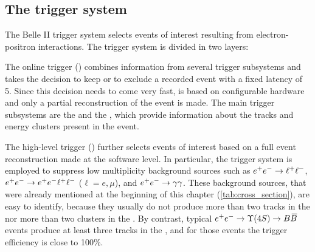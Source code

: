 \subsection{The trigger system} \label{sec:trigger}
The Belle II trigger system selects events of interest resulting from electron-positron interactions.
The trigger system is divided in two layers:
\bi
\item The online trigger (\LO) combines information from several trigger subsystems and takes the decision to keep or to exclude a recorded event with a fixed latency of 5\mus.
Since this decision needs to come very fast, \LO is based on configurable hardware and only a partial reconstruction of the event is made. 
The main \LO trigger subsystems are the \CDC and the \ECL, which provide information about the tracks and energy clusters present in the event.
\item The high-level trigger (\HLT) further selects events of interest based on a full event reconstruction made at the software level.
\ei
In particular, the trigger system is employed to suppress low multiplicity background sources such as $e^+e^-\rightarrow\ell^+\ell^-$, $e^+e^-\rightarrow e^+e^-\ell^+\ell^-$ ($\ell=e,\mu$), and $e^+e^-\rightarrow\gamma\gamma$.
These background sources, that were already mentioned at the beginning of this chapter (\cref{tab:cross_section}), are easy to identify, because they usually do not produce more than two tracks in the \CDC nor more than two clusters in the \ECL.
By contrast, typical $\epem\to\Y4S\to\BB$ events produce at least three tracks in the \CDC, and for those events the trigger efficiency is close to 100\%.

